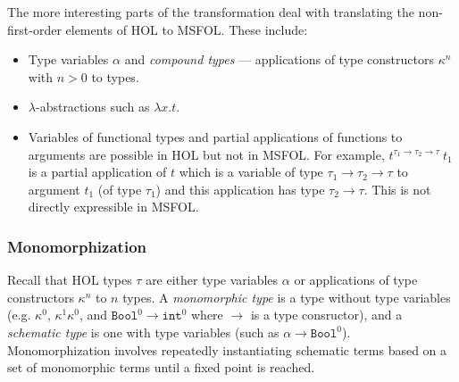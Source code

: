 \documentclass{article}
\begin{document}
	The more interesting parts of the 
	transformation deal with 
	translating the non-first-order
	elements of HOL to MSFOL. These 
	include:
	\begin{itemize}
		\item Type variables $\alpha$
		and \textit{compound types} ---
		applications of type constructors
		$\kappa^n$ with $n > 0$ to 
		types.
		\item $\lambda$-abstractions 
		such as $\lambda x. t$.
		\item Variables of functional 
		types and partial applications 
		of functions to arguments are 
		possible in HOL but not in 
		MSFOL. For example, 
		$t^{\tau_1 \to \tau_2 \to 
			\tau}\ t_1$ is a 
		partial application of $t$ 
		which is a variable of type 
		$\tau_1 \to \tau_2 \to \tau$
		to argument $t_1$ (of type 
		$\tau_1$) and this 
		application has type 
		$\tau_2 \to \tau$.
		This is not directly 
		expressible in MSFOL.
	\end{itemize}
	
	\subsubsection{Monomorphization}
	Recall that HOL types $\tau$ are 
	either type	variables $\alpha$ or 
	applications of type constructors 
	$\kappa^n$ to $n$ types.
	A \textit{monomorphic type} is a
	type without type variables 
	(e.g. $\kappa^0$, $\kappa^1 
	\kappa^0$, and $\texttt{Bool}^0 
	\to \texttt{int}^0$ 
	where $\to$ is 
	a type consructor), and 
	a \textit{schematic type} is one 
	with type variables (such as 
	$\alpha \to \texttt{Bool}^0$). 
	Monomorphization involves 
	repeatedly instantiating schematic
	terms based on a set of 
	monomorphic terms until a fixed 
	point is reached.
	
\end{document}
